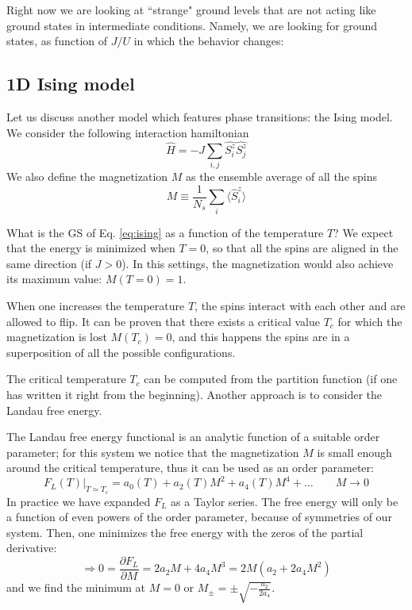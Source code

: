 Right now we are looking at ``strange" ground levels that are not acting like ground states in intermediate conditions. Namely, we are looking for ground states, as function of $J/U$ in which the behavior changes:
\begin{center}
        \scalebox{1.2}{
            
        }
\end{center}






\subsection{1D Ising model}

Let us discuss another model which features phase transitions: the Ising model.
We consider the following interaction hamiltonian
\begin{equation}
\label{eq:ising}
\hat{H}=-J\sum_{i,j} \hat{S_i^z}\hat{S_j^z}
\end{equation}
We also define the magnetization $M$ as the ensemble average of all the spins
$$M \equiv \frac{1}{N_s} \sum_i\langle \hat{S}_i^z\rangle$$

What is the GS of Eq. \ref{eq:ising} as a function of the temperature $T$? We expect that the energy is minimized when $T=0$, so that all the spins are aligned in the same direction (if $J>0$). In this settings, the magnetization would also achieve its maximum value: $M(T=0) = 1$.


When one increases the temperature $T$, the spins interact with each other and are allowed to flip. It can be proven that there exists a critical value $T_c$ for which the magnetization is lost $M(T_c)=0$, and this happens the spins are in a superposition of all the possible configurations.
\begin{center}
    \scalebox{1.2}{  }
\end{center}

The critical temperature $T_c$ can be computed from the partition function (if one has written it right from the beginning). Another approach is to consider the Landau free energy.

The Landau free energy functional is an analytic function of a suitable order parameter; for this system we notice that the magnetization $M$ is small enough around the critical temperature, thus it can be used as an order parameter:
$$F_L(T)\big|_{T\simeq T_c} = a_0(T) + a_2(T)M^2 + a_4(T)M^4 + \dots \qquad M\rightarrow0$$
In practice we have expanded $F_L$ as a Taylor series. The free energy will only be a function of even powers of the order parameter, because of symmetries of our system. Then, one minimizes the free energy with the zeros of the partial derivative:
\begin{equation*}
    \Rightarrow 0 = \frac{\partial F_L}{\partial M} = 2 a_2 M + 4 a_4 M^3 = 2M(a_2 + 2a_4 M^2)
\end{equation*}
and we find the minimum at $M=0$ or $M_{\pm}=\pm\sqrt{-\frac{a_2}{2a_4}}$.


